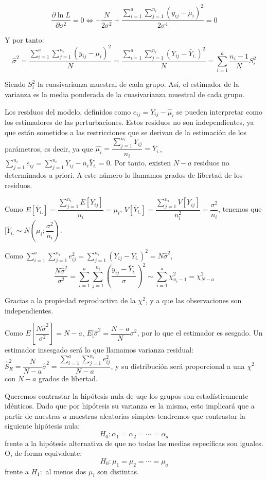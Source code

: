 \[\dfrac{\partial\ln{L}}{\partial\sigma^2}=0\Leftrightarrow-\dfrac{N}{2\sigma^2}+\dfrac{\sum_{i=1}^{a}\sum_{j=1}^{n_i}\left(y_{ij}-\mu_i\right)^2}{2\sigma^4}=0\]

Y por tanto:
\[\hat{\sigma}^2=\dfrac{\sum_{i=1}^{a}\sum_{j=1}^{n_i}\left(y_{ij}-\mu_i\right)^2}{N}=\dfrac{\sum_{i=1}^{a}\sum_{j=1}^{n_i}\left(Y_{ij}-\bar{Y}_{i.}\right)^2}{N}=\sum_{i=1}^{a}\dfrac{n_i-1}{N}S_i^2\]

Siendo $S_i^2$ la cuasivarianza muestral de cada grupo. As\'i, el estimador de la varianza es la media ponderada de la cuasivarianza muestral de cada grupo.

Los residuos del modelo, definidos como $e_{ij}=Y_{ij}-\hat{\mu}_{i}$ se pueden interpretar como los estimadores de las perturbaciones. Estos residuos no son independientes, ya que est\'an sometidos a las restricciones que se derivan de la estimaci\'on de los par\'ametros, es decir, ya que $\hat{\mu_i}=\dfrac{\sum_{j=1}^{n_i}Y_{ij}}{n_i}=\bar{Y}_{i.}$, $\sum_{j=1}^{n_i}e_{ij}=\sum_{j=1}^{n_i}Y_{ij}-n_i\bar{Y}_{i.}=0$. Por tanto, existen $N-a$ residuos no determinados a priori. A este n\'umero lo llamamos grados de libertad de los residuos.

Como $E[\bar{Y}_{i.}]=\dfrac{\sum_{j=1}^{n_i}E[Y_{ij}]}{n_i}=\mu_i$, $V[\bar{Y}_{i.}]=\dfrac{\sum_{j=1}^{n_i}V[Y_{ij}]}{n_i^2}=\dfrac{\sigma^2}{n_i}$, tenemos que $[\bar{Y}_{i.}\sim N\left(\mu_i;\dfrac{\sigma^2}{n_i}\right)$.

Como $\sum_{i=1}^{a}\sum_{j=1}^{n_i}e_{ij}^2=\sum_{j=1}^{n_i}(Y_{ij}-\bar{Y}_{i.})^2=N\hat{\sigma}^2$,
\[\dfrac{N\hat{\sigma}^2}{\sigma^2}=\sum_{i=1}^{a}\sum_{j=1}^{n_i}\left(\dfrac{y_{ij}-\bar{Y}_{i.}}{\sigma}\right)^2\sim\sum_{i=1}^{a}\chi^2_{n_i-1}=\chi^2_{N-a}\]

Gracias a la propiedad reproductiva de la $\chi^2$, y a que las observaciones son independientes.

Como $E[\dfrac{N\hat{\sigma}^2}{\sigma^2}]=N-a$, $E[\hat{\sigma}^2=\dfrac{N-a}{N}\sigma^2$, por lo que el estimador es sesgado. Un estimador insesgado ser\'a lo que llamamos varianza residual: $\hat{S}_R^2=\dfrac{N}{N-a}\hat{\sigma}^2=\dfrac{\sum_{i=1}^{a}\sum_{j=1}^{n_i}e_{ij}^2}{N-a}$, y su distribuci\'on ser\'a proporcional a una $\chi^2$ con $N-a$ grados de libertad.

Queremos contrastar la hip\'otesis nula de uqe los grupos son estad\'isticamente id\'enticos. Dado que por hip\'otesis su varianza es la misma, esto implicar\'a que a partir de nuestras $a$ muestras aleatorias simples tendremos que contrastar la siguiente hip\'otesis nula:
\[H_0:\alpha_1=\alpha_2=\cdots=\alpha_a\]
frente a la hip\'otesis alternativa de que no todas las medias espec\'ificas son iguales.
O, de forma equivalente:
\[H_0:\mu_1=\mu_2=\cdots=\mu_a\]
frente a $H_1:$ al menos dos $\mu_i$ son distintas.

